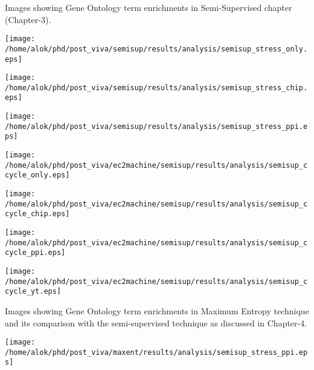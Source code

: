 Images showing Gene Ontology term enrichments in Semi-Supervised chapter (Chapter-3).

\begin{center}
 \texttt{[image: /home/alok/phd/post\_viva/semisup/results/analysis/semisup\_stress\_only.eps]}
\end{center}

\begin{center}
 \texttt{[image: /home/alok/phd/post\_viva/semisup/results/analysis/semisup\_stress\_chip.eps]}
\end{center}

\begin{center}
 \texttt{[image: /home/alok/phd/post\_viva/semisup/results/analysis/semisup\_stress\_ppi.eps]}
\end{center}

\begin{center}
 \texttt{[image: /home/alok/phd/post\_viva/ec2machine/semisup/results/analysis/semisup\_ccycle\_only.eps]}
\end{center}

\begin{center}
 \texttt{[image: /home/alok/phd/post\_viva/ec2machine/semisup/results/analysis/semisup\_ccycle\_chip.eps]}
\end{center}
\begin{center}
 \texttt{[image: /home/alok/phd/post\_viva/ec2machine/semisup/results/analysis/semisup\_ccycle\_ppi.eps]}
\end{center}
\begin{center}
 \texttt{[image: /home/alok/phd/post\_viva/ec2machine/semisup/results/analysis/semisup\_ccycle\_yt.eps]}
\end{center}


Images showing Gene Ontology term enrichments in Maximum Entropy technique and its comparison with the semi-supervised technique as discussed in Chapter-4.
\begin{center}
 \texttt{[image: /home/alok/phd/post\_viva/maxent/results/analysis/semisup\_stress\_ppi.eps]}
\end{center}

